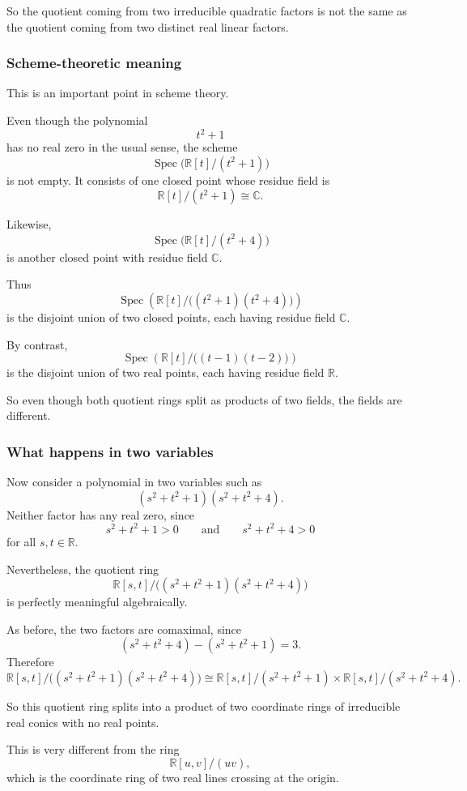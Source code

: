 \documentclass[12pt,a4paper]{article}
\theoremstyle{notespace}
\newcommand{\Spec}{\operatorname{Spec}}
\theoremstyle{definition}
\begin{document}
So the quotient coming from two irreducible quadratic factors is not the same as the quotient coming from two distinct real linear factors.

\subsubsection{Scheme-theoretic meaning}

This is an important point in scheme theory.

Even though the polynomial
\[
t^2+1
\]
has no real zero in the usual sense, the scheme
\[
\Spec\bigl(\mathbb{R}[t]/(t^2+1)\bigr)
\]
is not empty. It consists of one closed point whose residue field is
\[
\mathbb{R}[t]/(t^2+1)\cong \mathbb{C}.
\]

Likewise,
\[
\Spec\bigl(\mathbb{R}[t]/(t^2+4)\bigr)
\]
is another closed point with residue field \(\mathbb{C}\).

Thus
\[
\Spec\!\left(\mathbb{R}[t]/\bigl((t^2+1)(t^2+4)\bigr)\right)
\]
is the disjoint union of two closed points, each having residue field \(\mathbb{C}\).

By contrast,
\[
\Spec\!\left(\mathbb{R}[t]/\bigl((t-1)(t-2)\bigr)\right)
\]
is the disjoint union of two real points, each having residue field \(\mathbb{R}\).

So even though both quotient rings split as products of two fields, the fields are different.

\subsubsection{What happens in two variables}

Now consider a polynomial in two variables such as
\[
(s^2+t^2+1)(s^2+t^2+4).
\]
Neither factor has any real zero, since
\[
s^2+t^2+1>0
\qquad\text{and}\qquad
s^2+t^2+4>0
\]
for all \(s,t\in \mathbb{R}\).

Nevertheless, the quotient ring
\[
\mathbb{R}[s,t]\Big/\bigl((s^2+t^2+1)(s^2+t^2+4)\bigr)
\]
is perfectly meaningful algebraically.

As before, the two factors are comaximal, since
\[
(s^2+t^2+4)-(s^2+t^2+1)=3.
\]
Therefore
\[
\mathbb{R}[s,t]\Big/\bigl((s^2+t^2+1)(s^2+t^2+4)\bigr)
\cong
\mathbb{R}[s,t]/(s^2+t^2+1)\times \mathbb{R}[s,t]/(s^2+t^2+4).
\]

So this quotient ring splits into a product of two coordinate rings of irreducible real conics with no real points.

This is very different from the ring
\[
\mathbb{R}[u,v]/(uv),
\]
which is the coordinate ring of two real lines crossing at the origin.
\end{document}
